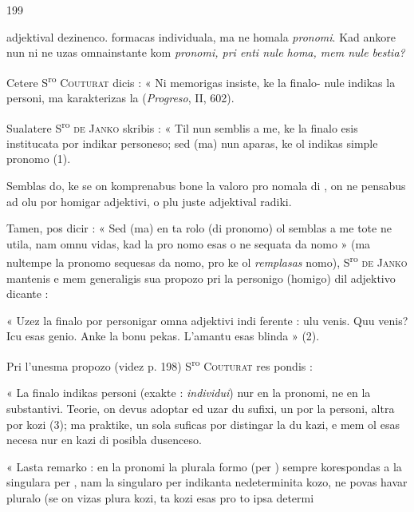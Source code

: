 \begin{VUpage}[203]{199}

\VUcontinue
adjektival dezinenco.  formacas individuala, ma ne homala\nl
\textit{pronomi}. Kad ankore nun ni ne uzas omnainstante \nl
{} kom \textit{pronomi, pri enti nule homa, mem nule bestia?}\parplein

Cetere S\textsuperscript{ro} \textsc{Couturat} dicis : « Ni memorigas insiste, ke la\nl
finalo-  nule indikas la personi, ma karakterizas la \cc
{} (\textit{Progreso}, II, 602).

Sualatere S\textsuperscript{ro} \textsc{de Janko} skribis : « Til nun semblis a me,\nl
ke la finalo  esis institucata por indikar personeso; sed\nl
(ma) nun aparas, ke ol indikas simple pronomo (1).

Semblas do, ke se on komprenabus bone la valoro pro\cc
nomala di , on ne pensabus ad olu por homigar adjektivi,\nl
o plu juste adjektival radiki.

Tamen, pos dicir : « Sed (ma) en ta rolo (di pronomo)\nl
ol semblas a me tote ne utila, nam omnu vidas, kad la pro\cc
nomo esas o ne sequata da nomo » (ma nultempe la\nl
pronomo sequesas da nomo, pro ke ol \textit{remplasas} nomo),\nl
S\textsuperscript{ro} \textsc{de Janko} mantenis e mem generaligis sua propozo pri la\nl
personigo (homigo) dil adjektivo dicante :

« Uzez la finalo  por personigar omna adjektivi indi\cc
ferente : \textquotesingle{} ulu venis. Quu venis? Icu esas genio. Anke la bonu\nl
pekas. L'amantu esas blinda \textquotesingle{} » (2).

Pri l'unesma propozo (videz p. 198) S\textsuperscript{ro} \textsc{Couturat} res\cc
pondis :

« La finalo  indikas personi (exakte : \textit{individui}) nur\nl
en la pronomi, ne en la substantivi. Teorie, on devus adoptar\nl
ed uzar du sufixi, un por la personi, altra por kozi (3);\nl
ma praktike, un sola suficas por distingar la du kazi, e mem\nl
ol esas necesa nur en kazi di posibla dusenceso.

« Lasta remarko : en la pronomi la plurala formo (per )\nl
sempre korespondas a la singulara per , nam la singularo\nl
per  indikanta nedeterminita kozo, ne povas havar pluralo\nl
(se on vizas plura kozi, ta kozi esas pro to ipsa determi\cc
\end{VUpage}

